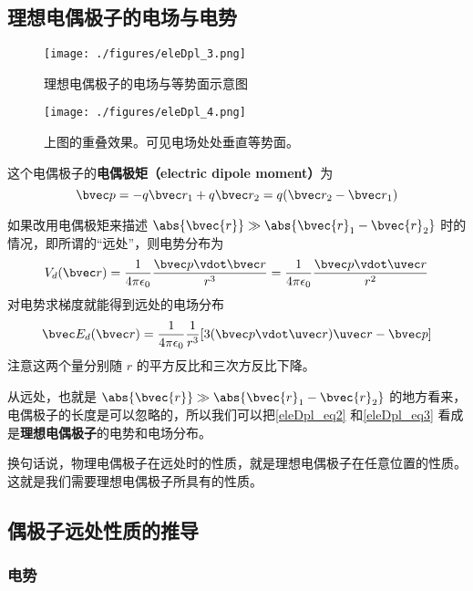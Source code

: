 \subsection{理想电偶极子的电场与电势}
\begin{figure}[ht]
\centering
\texttt{[image: ./figures/eleDpl\_3.png]}
\caption{理想电偶极子的电场与等势面示意图} \label{eleDpl_fig3}
\end{figure}

\begin{figure}[ht]
\centering
\texttt{[image: ./figures/eleDpl\_4.png]}
\caption{上图的重叠效果。可见电场处处垂直等势面。} \label{eleDpl_fig4}
\end{figure}

这个电偶极子的\textbf{电偶极矩（electric dipole moment）}为
\begin{equation}\label{eleDpl_eq1}
\bvec p = -q \bvec r_1 + q \bvec r_2 = q (\bvec r_2 - \bvec r_1)
\end{equation} 

如果改用电偶极矩来描述 $\abs{\bvec{r}}\gg\\\abs{\bvec{r}_1-\bvec{r}_2}$ 时的情况，即所谓的“远处”，则电势分布为
\begin{equation}\label{eleDpl_eq2}
V_d(\bvec r) = \frac{1}{4\pi\epsilon_0} \frac{\bvec p\vdot \bvec r}{r^3} = \frac{1}{4\pi\epsilon_0} \frac{\bvec p \vdot \uvec r}{r^2}
\end{equation}
对电势求梯度就能得到远处的电场分布
\begin{equation}\label{eleDpl_eq3}
\bvec E_d(\bvec r) = \frac{1}{4\pi\epsilon_0} \frac{1}{r^3} [3(\bvec p \vdot \uvec r) \uvec r - \bvec p]
\end{equation}
注意这两个量分别随 $r$ 的平方反比和三次方反比下降。

从远处，也就是 $\abs{\bvec{r}}\gg\\\abs{\bvec{r}_1-\bvec{r}_2}$ 的地方看来，电偶极子的长度是可以忽略的，所以我们可以把\autoref{eleDpl_eq2} 和\autoref{eleDpl_eq3} 看成是\textbf{理想电偶极子}的电势和电场分布。

换句话说，物理电偶极子在远处时的性质，就是理想电偶极子在任意位置的性质。这就是我们需要理想电偶极子所具有的性质。

\subsection{偶极子远处性质的推导}

\subsubsection{电势}

